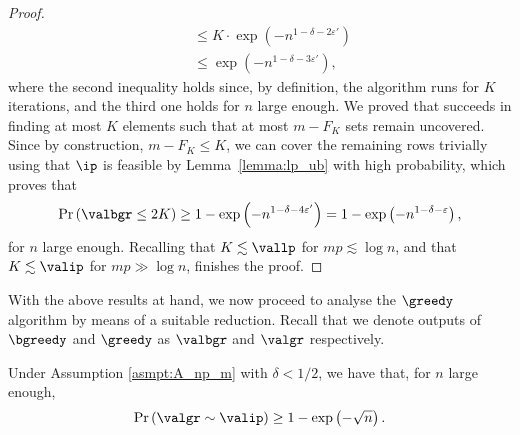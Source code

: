 \begin{proof}
\begin{align*}
&\quad \leq K \cdot \exp\left(- n^{1 - \delta - 2\varepsilon'}\right) \\
&\quad \leq \exp\left(- n^{1 - \delta - 3\varepsilon'} \right),
\end{align*}
where the second inequality holds since, by definition, the algorithm runs for $K$ iterations, and the third one holds for $n$ large enough. 
We proved that \bgreedy succeeds in finding at most $K$ elements such that at most $m - F_{K}$ sets remain uncovered. Since by construction, $m - F_{K} \leq K$, we can cover the remaining rows trivially using that \(\ip\) is feasible by Lemma~\ref{lemma:lp_ub} with high probability, which proves that 
\begin{equation*}
    \Pr \left(\valbgr \leq 2K\right) \geq 1 - \exp\left(-n^{1 - \delta - 4\varepsilon'}\right) =1 - \exp\left(-n^{1 - \delta - \varepsilon}\right) ,
\end{equation*}
for $n$ large enough. Recalling that \(K \lesssim \vallp\) for \(mp \lesssim \log n\), and that \(K \lesssim \valip\) for \(mp \gg \log n\), finishes the proof. 
\end{proof}
\noindent
With the above results at hand, we now proceed to analyse the \(\greedy\) algorithm by means of a suitable reduction. Recall that we denote outputs of \(\bgreedy\) and \(\greedy\) as \(\valbgr\) and \(\valgr\) respectively. 
\begin{theorem} \label{thm:greedy}
Under Assumption \ref{asmpt:A_np_m} with $\delta < 1/2$, we have that, for \(n\) large enough,
\begin{equation*}
    \Pr\left(\valgr \sim \valip \right) \geq 1 - \exp\left(-\sqrt{n}\right).
\end{equation*}
\end{theorem}

